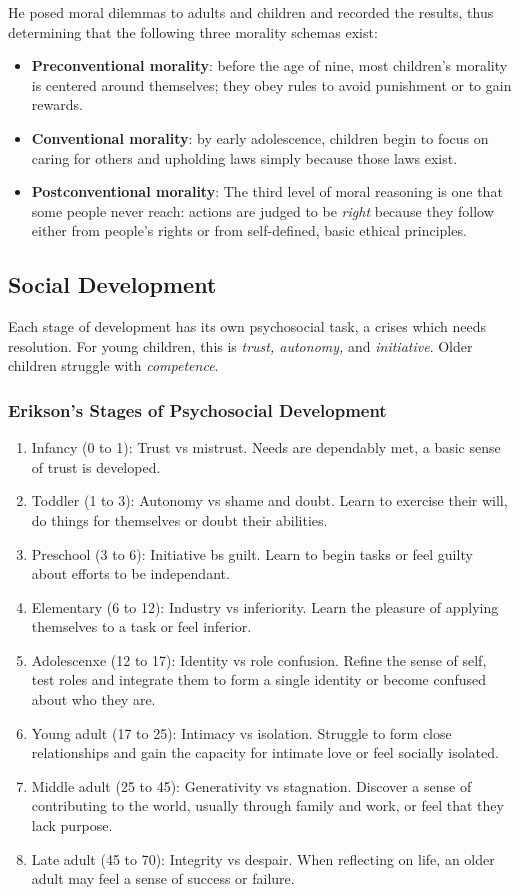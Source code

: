 \documentclass[12pt]{article}
\begin{document}
He posed moral dilemmas to adults and children and recorded the results, thus determining that the following three morality schemas exist:
\begin{itemize}
\item {\bf Preconventional morality}: before the age of nine, most children's morality is centered around themselves; they obey rules to avoid punishment or to gain rewards.
\item {\bf Conventional morality}: by early adolescence, children begin to focus on caring for others and upholding laws simply because those laws exist.
\item {\bf Postconventional morality}: The third level of moral reasoning is one that some people never reach: actions are judged to be {\it right} because they follow either from people's rights or from self-defined, basic ethical principles.
\end{itemize}

\subsection*{Social Development}
Each stage of development has its own psychosocial task, a crises which needs resolution. For young children, this is {\it trust, autonomy,} and {\it initiative}. Older children struggle with {\it competence}.

\subsubsection*{Erikson's Stages of Psychosocial Development}
\begin{enumerate}
\item Infancy (0 to 1): Trust vs mistrust. Needs are dependably met, a basic sense of trust is developed.
\item Toddler (1 to 3): Autonomy vs shame and doubt. Learn to exercise their will, do things for themselves or doubt their abilities.
\item Preschool (3 to 6): Initiative bs guilt. Learn to begin tasks or feel guilty about efforts to be independant.
\item Elementary (6 to 12): Industry vs inferiority. Learn the pleasure of applying themselves to a task or feel inferior.
\item Adolescenxe (12 to 17): Identity vs role confusion. Refine the sense of self, test roles and integrate them to form a single identity or become confused about who they are.
\item Young adult (17 to 25): Intimacy vs isolation. Struggle to form close relationships and gain the capacity for intimate love or feel socially isolated.
\item Middle adult (25 to 45): Generativity vs stagnation. Discover a sense of contributing to the world, usually through family and work, or feel that they lack purpose.
\item Late adult (45 to 70): Integrity vs despair. When reflecting on life, an older adult may feel a sense of success or failure.
\end{enumerate}
\end{document}
